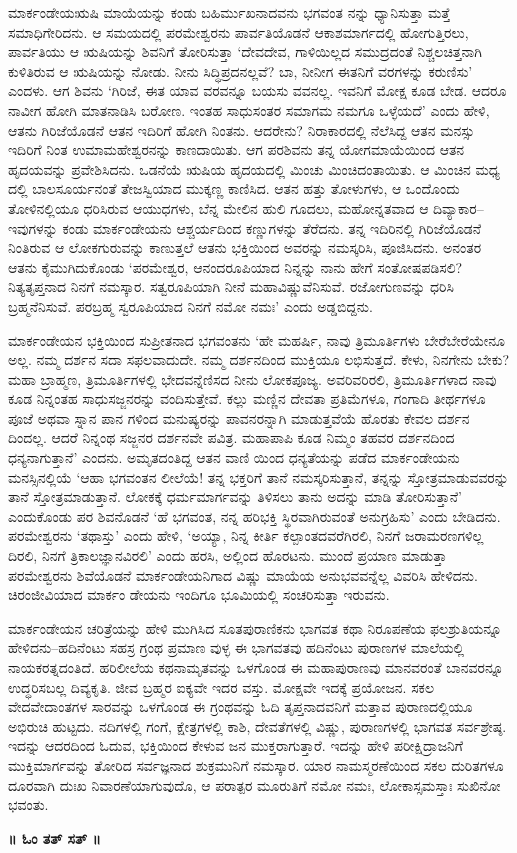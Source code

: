 ಮಾರ್ಕಂಡೇಯಋಷಿ ಮಾಯೆಯನ್ನು ಕಂಡು ಬಹಿರ್ಮುಖನಾದವನು ಭಗವಂತ ನನ್ನು ಧ್ಯಾನಿಸುತ್ತಾ ಮತ್ತೆ ಸಮಾಧಿಗೇರಿದನು. ಆ ಸಮಯದಲ್ಲಿ ಪರಮೇಶ್ವರನು ಪಾರ್ವತಿಯೊಡನೆ ಆಕಾಶಮಾರ್ಗದಲ್ಲಿ ಹೋಗುತ್ತಿರಲು, ಪಾರ್ವತಿಯು ಆ ಋಷಿಯನ್ನು ಶಿವನಿಗೆ ತೋರಿಸುತ್ತಾ ‘ದೇವದೇವ, ಗಾಳಿಯಿಲ್ಲದ ಸಮುದ್ರದಂತೆ ನಿಶ್ಚಲಚಿತ್ತನಾಗಿ ಕುಳಿತಿರುವ ಆ ಋಷಿಯನ್ನು ನೋಡು. ನೀನು ಸಿದ್ಧಿಪ್ರದನಲ್ಲವೆ? ಬಾ, ನೀನೀಗ ಈತನಿಗೆ ವರಗಳನ್ನು ಕರುಣಿಸು’ ಎಂದಳು. ಆಗ ಶಿವನು ‘ಗಿರಿಜೆ, ಈತ ಯಾವ ವರವನ್ನೂ ಬಯಸು ವವನಲ್ಲ. ಇವನಿಗೆ ಮೋಕ್ಷ ಕೂಡ ಬೇಡ. ಆದರೂ ನಾವೀಗ ಹೋಗಿ ಮಾತನಾಡಿಸಿ ಬರೋಣ. ಇಂತಹ ಸಾಧುಸಂತರ ಸಮಾಗಮ ನಮಗೂ ಒಳ್ಳೆಯದೆ’ ಎಂದು ಹೇಳಿ, ಆತನು ಗಿರಿಜೆಯೊಡನೆ ಆತನ ಇದಿರಿಗೆ ಹೋಗಿ ನಿಂತನು. ಆದರೇನು? ನಿರಾಕಾರದಲ್ಲಿ ನೆಲೆಸಿದ್ದ ಆತನ ಮನಸ್ಸು ಇದಿರಿಗೆ ನಿಂತ ಉಮಾಮಹೇಶ್ವರನನ್ನು ಕಾಣದಾಯಿತು. ಆಗ ಪರಶಿವನು ತನ್ನ ಯೋಗಮಾಯೆಯಿಂದ ಆತನ ಹೃದಯವನ್ನು ಪ್ರವೇಶಿಸಿದನು. ಒಡನೆಯೆ ಋಷಿಯ ಹೃದಯದಲ್ಲಿ ಮಿಂಚು ಮಿಂಚಿದಂತಾಯಿತು. ಆ ಮಿಂಚಿನ ಮಧ್ಯ ದಲ್ಲಿ ಬಾಲಸೂರ್ಯನಂತೆ ತೇಜಸ್ವಿಯಾದ ಮುಕ್ಕಣ್ಣ ಕಾಣಿಸಿದ. ಆತನ ಹತ್ತು ತೋಳುಗಳು, ಆ ಒಂದೊಂದು ತೋಳಿನಲ್ಲಿಯೂ ಧರಿಸಿರುವ ಆಯುಧಗಳು, ಬೆನ್ನ ಮೇಲಿನ ಹುಲಿ ಗೂದಲು, ಮಹೋನ್ನತವಾದ ಆ ದಿವ್ಯಾಕಾರ–ಇವುಗಳನ್ನು ಕಂಡು ಮಾರ್ಕಂಡೇಯನು ಆಶ್ಚರ್ಯದಿಂದ ಕಣ್ಣುಗಳನ್ನು ತೆರೆದನು. ತನ್ನ ಇದಿರಿನಲ್ಲಿ ಗಿರಿಜೆಯೊಡನೆ ನಿಂತಿರುವ ಆ ಲೋಕಗುರುವನ್ನು ಕಾಣುತ್ತಲೆ ಆತನು ಭಕ್ತಿಯಿಂದ ಅವರನ್ನು ನಮಸ್ಕರಿಸಿ, ಪೂಜಿಸಿದನು. ಅನಂತರ ಆತನು ಕೈಮುಗಿದುಕೊಂಡು ‘ಪರಮೇಶ್ವರ, ಆನಂದರೂಪಿಯಾದ ನಿನ್ನನ್ನು ನಾನು ಹೇಗೆ ಸಂತೋಷಪಡಿಸಲಿ? ನಿತ್ಯತೃಪ್ತನಾದ ನಿನಗೆ ನಮಸ್ಕಾರ. ಸತ್ವರೂಪಿಯಾಗಿ ನೀನೆ ಮಹಾವಿಷ್ಣುವೆನಿಸುವೆ. ರಜೋಗುಣವನ್ನು ಧರಿಸಿ ಬ್ರಹ್ಮನೆನಿಸುವೆ. ಪರಬ್ರಹ್ಮ ಸ್ವರೂಪಿಯಾದ ನಿನಗೆ ನಮೋ ನಮಃ’ ಎಂದು ಅಡ್ಡಬಿದ್ದನು.

ಮಾರ್ಕಂಡೇಯನ ಭಕ್ತಿಯಿಂದ ಸುಪ್ರೀತನಾದ ಭಗವಂತನು ‘ಹೇ ಮಹರ್ಷಿ, ನಾವು ತ್ರಿಮೂರ್ತಿಗಳು ಬೇರೆಬೇರೆಯೇನೂ ಅಲ್ಲ. ನಮ್ಮ ದರ್ಶನ ಸದಾ ಸಫಲವಾದುದೇ. ನಮ್ಮ ದರ್ಶನದಿಂದ ಮುಕ್ತಿಯೂ ಲಭಿಸುತ್ತದೆ. ಕೇಳು, ನಿನಗೇನು ಬೇಕು? ಮಹಾ ಬ್ರಾಹ್ಮಣ, ತ್ರಿಮೂರ್ತಿಗಳಲ್ಲಿ ಭೇದವನ್ನೆಣಿಸದ ನೀನು ಲೋಕಪೂಜ್ಯ. ಅವರಿವರಿರಲಿ, ತ್ರಿಮೂರ್ತಿಗಳಾದ ನಾವು ಕೂಡ ನಿನ್ನಂತಹ ಸಾಧುಸಜ್ಜನರನ್ನು ವಂದಿಸುತ್ತೇವೆ. ಕಲ್ಲು ಮಣ್ಣಿನ ದೇವತಾ ಪ್ರತಿಮೆಗಳೂ, ಗಂಗಾದಿ ತೀರ್ಥಗಳೂ ಪೂಜೆ ಅಥವಾ ಸ್ನಾನ ಪಾನ ಗಳಿಂದ ಮನುಷ್ಯರನ್ನು ಪಾವನರನ್ನಾಗಿ ಮಾಡುತ್ತವೆಯೆ ಹೊರತು ಕೇವಲ ದರ್ಶನ ದಿಂದಲ್ಲ. ಆದರೆ ನಿನ್ನಂಥ ಸಜ್ಜನರ ದರ್ಶನವೇ ಪವಿತ್ರ. ಮಹಾಪಾಪಿ ಕೂಡ ನಿಮ್ಮಂ ತಹವರ ದರ್ಶನದಿಂದ ಧನ್ಯನಾಗುತ್ತಾನೆ’ ಎಂದನು. ಅಮೃತದಂತಿದ್ದ ಆತನ ವಾಣಿ ಯಿಂದ ಧನ್ಯತೆಯನ್ನು ಪಡೆದ ಮಾರ್ಕಂಡೇಯನು ಮನಸ್ಸಿನಲ್ಲಿಯೆ ‘ಆಹಾ ಭಗವಂತನ ಲೀಲೆಯೆ! ತನ್ನ ಭಕ್ತರಿಗೆ ತಾನೆ ನಮಸ್ಕರಿಸುತ್ತಾನೆ, ತನ್ನನ್ನು ಸ್ತೋತ್ರಮಾಡುವವರನ್ನು ತಾನೆ ಸ್ತೋತ್ರಮಾಡುತ್ತಾನೆ. ಲೋಕಕ್ಕೆ ಧರ್ಮಮಾರ್ಗವನ್ನು ತಿಳಿಸಲು ತಾನು ಅದನ್ನು ಮಾಡಿ ತೋರಿಸುತ್ತಾನೆ’ ಎಂದುಕೊಂಡು ಪರ ಶಿವನೊಡನೆ ‘ಹೆ ಭಗವಂತ, ನನ್ನ ಹರಿಭಕ್ತಿ ಸ್ಥಿರವಾಗಿರುವಂತೆ ಅನುಗ್ರಹಿಸು’ ಎಂದು ಬೇಡಿದನು. ಪರಮೇಶ್ವರನು ‘ತಥಾಸ್ತು’ ಎಂದು ಹೇಳಿ, ‘ಅಯ್ಯಾ, ನಿನ್ನ ಕೀರ್ತಿ ಕಲ್ಪಾಂತದವರೆಗಿರಲಿ, ನಿನಗೆ ಜರಾಮರಣಗಳಿಲ್ಲ ದಿರಲಿ, ನಿನಗೆ ತ್ರಿಕಾಲಜ್ಞಾನವಿರಲಿ’ ಎಂದು ಹರಸಿ, ಅಲ್ಲಿಂದ ಹೊರಟನು. ಮುಂದೆ ಪ್ರಯಾಣ ಮಾಡುತ್ತಾ ಪರಮೇಶ್ವರನು ಶಿವೆಯೊಡನೆ ಮಾರ್ಕಂಡೇಯನಿಗಾದ ವಿಷ್ಣು ಮಾಯೆಯ ಅನುಭವವನ್ನೆಲ್ಲ ವಿವರಿಸಿ ಹೇಳಿದನು. ಚಿರಂಜೀವಿಯಾದ ಮಾರ್ಕಂ ಡೇಯನು ಇಂದಿಗೂ ಭೂಮಿಯಲ್ಲಿ ಸಂಚರಿಸುತ್ತಾ ಇರುವನು.

ಮಾರ್ಕಂಡೇಯನ ಚರಿತ್ರೆಯನ್ನು ಹೇಳಿ ಮುಗಿಸಿದ ಸೂತಪುರಾಣಿಕನು ಭಾಗವತ ಕಥಾ ನಿರೂಪಣೆಯ ಫಲಶ್ರುತಿಯನ್ನೂ ಹೇಳಿದನು–ಹದಿನೆಂಟು ಸಹಸ್ರ ಗ್ರಂಥ ಪ್ರಮಾಣ ವುಳ್ಳ ಈ ಭಾಗವತವು ಹದಿನೆಂಟು ಪುರಾಣಗಳ ಮಾಲೆಯಲ್ಲಿ ನಾಯಕರತ್ನದಂತಿದೆ. ಹರಿಲೀಲೆಯ ಕಥನಾಮೃತವನ್ನು ಒಳಗೊಂಡ ಈ ಮಹಾಪುರಾಣವು ಮಾನವರಂತೆ ಬಾನವರನ್ನೂ ಉದ್ಧರಿಸಬಲ್ಲ ದಿವ್ಯಕೃತಿ. ಜೀವ ಬ್ರಹ್ಮರ ಐಕ್ಯವೇ ಇದರ ವಸ್ತು. ಮೋಕ್ಷವೇ ಇದಕ್ಕೆ ಪ್ರಯೋಜನ. ಸಕಲ ವೇದವೇದಾಂತಗಳ ಸಾರವನ್ನು ಒಳಗೊಂಡ ಈ ಗ್ರಂಥವನ್ನು ಓದಿ ತೃಪ್ತನಾದವನಿಗೆ ಮತ್ತಾವ ಪುರಾಣದಲ್ಲಿಯೂ ಅಭಿರುಚಿ ಹುಟ್ಟದು. ನದಿಗಳಲ್ಲಿ ಗಂಗೆ, ಕ್ಷೇತ್ರಗಳಲ್ಲಿ ಕಾಶಿ, ದೇವತೆಗಳಲ್ಲಿ ವಿಷ್ಣು, ಪುರಾಣಗಳಲ್ಲಿ ಭಾಗವತ ಸರ್ವಶ್ರೇಷ್ಠ. ಇದನ್ನು ಆದರದಿಂದ ಓದುವ, ಭಕ್ತಿಯಿಂದ ಕೇಳುವ ಜನ ಮುಕ್ತರಾಗುತ್ತಾರೆ. ಇದನ್ನು ಹೇಳಿ ಪರೀಕ್ಷಿದ್ರಾಜನಿಗೆ ಮುಕ್ತಿಮಾರ್ಗವನ್ನು ತೋರಿದ ಸರ್ವಜ್ಞನಾದ ಶುಕ್ರಮುನಿಗೆ ನಮಸ್ಕಾರ. ಯಾರ ನಾಮಸ್ಮರಣೆಯಿಂದ ಸಕಲ ದುರಿತಗಳೂ ದೂರವಾಗಿ ದುಃಖ ನಿವಾರಣೆಯಾಗುವುದೊ, ಆ ಪರಾತ್ಪರ ಮೂರುತಿಗೆ ನಮೋ ನಮಃ, ಲೋಕಾಸ್ಸಮಸ್ತಾಃ ಸುಖಿನೋ ಭವಂತು.

\begin{center}
\textbf{॥ ಓಂ ತತ್ ಸತ್ ॥}
\end{center}

